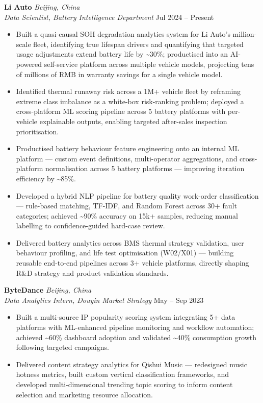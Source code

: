 \documentclass[a4paper,9pt]{article}
\begin{document}
\noindent\textbf{Li Auto} \hfill \textit{Beijing, China}\\
\textit{Data Scientist, Battery Intelligence Department} \hfill Jul 2024 -- Present
\begin{itemize}
    \item Built a quasi-causal SOH degradation analytics system for Li Auto's million-scale fleet, identifying true lifespan drivers and quantifying that targeted usage adjustments extend battery life by \textasciitilde30\%; productised into an AI-powered self-service platform across multiple vehicle models, projecting tens of millions of RMB in warranty savings for a single vehicle model.

    \item Identified thermal runaway risk across a 1M+ vehicle fleet by reframing extreme class imbalance as a white-box risk-ranking problem; deployed a cross-platform ML scoring pipeline across 5 battery platforms with per-vehicle explainable outputs, enabling targeted after-sales inspection prioritisation.

    \item Productised battery behaviour feature engineering onto an internal ML platform --- custom event definitions, multi-operator aggregations, and cross-platform normalisation across 5 battery platforms --- improving iteration efficiency by \textasciitilde85\%.

    \item Developed a hybrid NLP pipeline for battery quality work-order classification --- rule-based matching, TF-IDF, and Random Forest across 30+ fault categories; achieved \textasciitilde90\% accuracy on 15k+ samples, reducing manual labelling to confidence-guided hard-case review.

    \item Delivered battery analytics across BMS thermal strategy validation, user behaviour profiling, and life test optimisation (W02/X01) --- building reusable end-to-end pipelines across 3+ vehicle platforms, directly shaping R\&D strategy and product validation standards.
\end{itemize}

\vspace{2pt}
\noindent\textbf{ByteDance} \hfill \textit{Beijing, China}\\
\textit{Data Analytics Intern, Douyin Market Strategy} \hfill May -- Sep 2023
\begin{itemize}
    \item Built a multi-source IP popularity scoring system integrating 5+ data platforms with ML-enhanced pipeline monitoring and workflow automation; achieved \textasciitilde60\% dashboard adoption and validated \textasciitilde40\% consumption growth following targeted campaigns.

    \item Delivered content strategy analytics for Qishui Music --- redesigned music hotness metrics, built custom vertical classification frameworks, and developed multi-dimensional trending topic scoring to inform content selection and marketing resource allocation.
\end{itemize}
\end{document}
